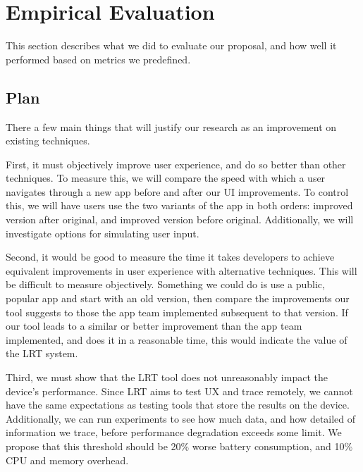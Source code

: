 \section{Empirical Evaluation}
This section describes what we did to evaluate our proposal, and how well it performed
based on metrics we predefined.

\subsection{Plan}
There a few main things that will justify our research as an improvement on existing techniques.

First, it must objectively improve user experience, and do so better than other techniques.
To measure this, we will compare the speed with which a user navigates through a new app
before and after our UI improvements. To control this, we will have users use the two variants
of the app in both orders: improved version after original, and improved version before original.
Additionally, we will investigate options for simulating user input.

Second, it would be good to measure the time it takes developers to achieve equivalent
improvements in user experience with alternative techniques. This will be difficult to
measure objectively. Something we could do is use a public, popular app and start with
an old version, then compare the improvements our tool suggests to those the app team
implemented subsequent to that version. If our tool leads to a similar or better improvement
than the app team implemented, and does it in a reasonable time, this would indicate the
value of the LRT system.

Third, we must show that the LRT tool does not unreasonably impact the device's performance.
Since LRT aims to test UX and trace remotely, we cannot have the same expectations as testing
tools that store the results on the device. Additionally, we can run experiments to see how
much data, and how detailed of information we trace, before performance degradation exceeds
some limit. We propose that this threshold should be 20\% worse battery consumption, and 10\%
CPU and memory overhead.

